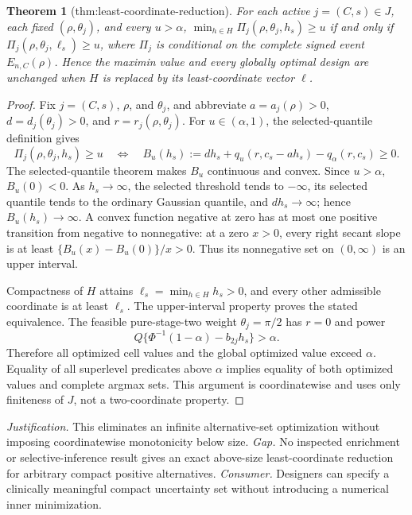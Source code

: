 \documentclass{article}
\newtheorem{theorem}{Theorem}
\begin{document}
\begin{theorem}[thm:least-coordinate-reduction]\label{thm:least-coordinate-reduction}
For each active \(j=(C,s)\in J\), each fixed \( (\rho,\theta_j)\), and every \(u>\alpha\), \(\min_{h\in H}\Pi_j(\rho,\theta_j,h_s)\ge u\) if and only if \(\Pi_j(\rho,\theta_j,\ell_s)\ge u\), where \(\Pi_j\) is conditional on the complete signed event \(E_{n,C}(\rho)\). Hence the maximin value and every globally optimal design are unchanged when \(H\) is replaced by its least-coordinate vector \(\ell\).
\end{theorem}
\begin{proof}
Fix \(j=(C,s)\), \(\rho\), and \(\theta_j\), and abbreviate \(a=a_j(\rho)>0\), \(d=d_j(\theta_j)>0\), and \(r=r_j(\rho,\theta_j)\).  For \(u\in(\alpha,1)\), the selected-quantile definition gives
\[
\Pi_j(\rho,\theta_j,h_s)\ge u
\quad\Longleftrightarrow\quad
B_u(h_s):=dh_s+q_u(r,c_s-ah_s)-q_\alpha(r,c_s)\ge0.
\]
The selected-quantile theorem makes \(B_u\) continuous and convex.  Since \(u>\alpha\), \(B_u(0)<0\).  As \(h_s\to\infty\), the selected threshold tends to \(-\infty\), its selected quantile tends to the ordinary Gaussian quantile, and \(dh_s\to\infty\); hence \(B_u(h_s)\to\infty\).  A convex function negative at zero has at most one positive transition from negative to nonnegative: at a zero \(x>0\), every right secant slope is at least \(\{B_u(x)-B_u(0)\}/x>0\).  Thus its nonnegative set on \((0,\infty)\) is an upper interval.

Compactness of \(H\) attains \(\ell_s=\min_{h\in H}h_s>0\), and every other admissible coordinate is at least \(\ell_s\).  The upper-interval property proves the stated equivalence.  The feasible pure-stage-two weight \(\theta_j=\pi/2\) has \(r=0\) and power
\[
Q\{\Phi^{-1}(1-\alpha)-b_{2j}h_s\}>\alpha.
\]
Therefore all optimized cell values and the global optimized value exceed \(\alpha\).  Equality of all superlevel predicates above \(\alpha\) implies equality of both optimized values and complete argmax sets.  This argument is coordinatewise and uses only finiteness of \(J\), not a two-coordinate property.
\end{proof}
\par\smallskip\noindent \textit{Justification.} This eliminates an infinite alternative-set optimization without imposing coordinatewise monotonicity below size. \textit{Gap.} No inspected enrichment or selective-inference result gives an exact above-size least-coordinate reduction for arbitrary compact positive alternatives. \textit{Consumer.} Designers can specify a clinically meaningful compact uncertainty set without introducing a numerical inner minimization.
\end{document}
